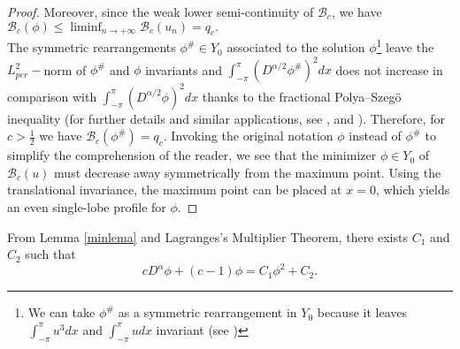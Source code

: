 \documentclass[12pt,reqno]{amsart}
\newcommand{\2}{L^2_{per}(0, T)}
\numberwithin{equation}{section}
\numberwithin{figure}{section}
\begin{document}
\begin{proof}
	Moreover, since the weak lower semi-continuity of $\mathcal{B}_c$, we have
	$\displaystyle \mathcal{B}_c(\phi) \leq  \liminf_{n \rightarrow +\infty} \mathcal{B}_c(u_n) = q_c.$\\
\indent The   symmetric rearrangements $\phi^{\#}\in Y_0$ associated to the solution $\phi$\footnote{We can take $\phi^{\#}$ as a symmetric rearrangement in $Y_0$ because it leaves $\int_{-\pi}^{\pi}u^3dx$ and $\int_{-\pi}^{\pi}udx$ invariant (see \cite[Proposition 2.1]{hur})} leave the $L_{per}^2-$norm of $\phi^{\#}$ and $\phi$ invariants and $\int_{-\pi}^{\pi}(D^{\alpha/2}\phi^{\#})^2dx$ does not increase in comparison with $\int_{-\pi}^{\pi}(D^{\alpha/2}\phi)^2dx$ thanks to the  fractional Polya--Szeg\"{o} inequality (for further details and similar applications, see \cite[Lemma A.1]{CJ2019}, \cite[Proposition 2.1]{hur} and \cite[Theorem 2.1]{NPL}). Therefore, for $c>\frac{1}{2}$ we have $\mathcal{B}_c(\phi^{\#})=q_c$. Invoking the original notation $\phi$ instead of $\phi^{\#}$ to simplify the comprehension of the reader, we see that the minimizer $\phi \in Y_0$ of $\mathcal{B}_c(u)$ must decrease away symmetrically from
the maximum point. Using the translational invariance, the maximum point can be placed at $x = 0$,
which yields an even single-lobe profile for $\phi$.
\end{proof}


From Lemma \eqref{minlema} and Lagranges's Multiplier Theorem, there exists $C_1$ and $C_2$ such that
\begin{equation}\label{lagrange}
\displaystyle cD^{\alpha}\phi +(c -1)\phi = C_1\phi^2 +C_2.
\end{equation}
\end{document}
